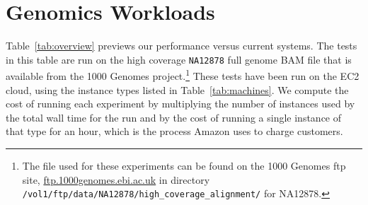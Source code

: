\documentclass[masters]{ucbthesis}
\begin{document}
\section{Genomics Workloads}
\label{sec:genomics-performance}

Table~\ref{tab:overview} previews our performance versus current systems. The tests in this table are run on the
high coverage \texttt{NA12878} full genome BAM file that is available from the 1000 Genomes
project.\footnote{The file used for these experiments can be found on the
1000 Genomes ftp site, \url{ftp.1000genomes.ebi.ac.uk} in directory 
\texttt{/vol1/ftp/data/NA12878/high\_coverage\_alignment/} for NA12878.} These tests have been run on the EC2 cloud, using the instance types listed in
Table~\ref{tab:machines}. We compute the cost of running each experiment by multiplying the number of instances
used by the total wall time for the run and by the cost of running a single instance of that type for an hour, which is
the process Amazon uses to charge customers.
\end{document}
